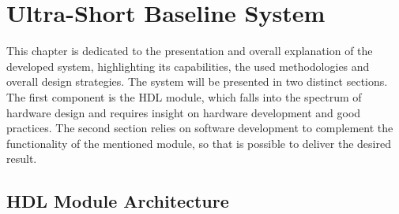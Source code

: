 \chapter{Ultra-Short Baseline System} \label{chap:proposed_sys}

This chapter is dedicated to the presentation and overall explanation of the developed system, highlighting its capabilities, the used methodologies and overall design strategies. 
The system will be presented in two distinct sections. The first component is the HDL module, which falls into the spectrum of hardware design and requires insight on hardware development and good practices. The second section relies on software development to complement the functionality of the mentioned module, so that is possible to deliver the desired result.

\section{HDL Module Architecture} \label{subchap:HDL module}





